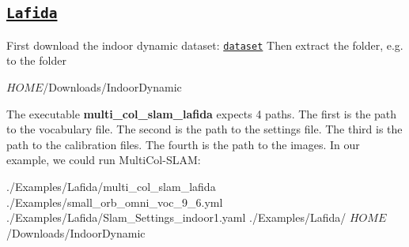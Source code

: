 \subsection*{\href{http://www.ipf.kit.edu/lafida.php}{\tt Lafida}}

First download the indoor dynamic dataset\+: \href{http://www2.ipf.kit.edu/~pcv2016/downloads/indoor_dynamic.zip}{\tt dataset} Then extract the folder, e.\+g. to the folder \begin{DoxyVerb}$HOME$/Downloads/IndoorDynamic
\end{DoxyVerb}


The executable {\bfseries multi\+\_\+col\+\_\+slam\+\_\+lafida} expects 4 paths. The first is the path to the vocabulary file. The second is the path to the settings file. The third is the path to the calibration files. The fourth is the path to the images. In our example, we could run Multi\+Col-\/\+S\+L\+AM\+: \begin{DoxyVerb}./Examples/Lafida/multi_col_slam_lafida ./Examples/small_orb_omni_voc_9_6.yml  ./Examples/Lafida/Slam_Settings_indoor1.yaml ./Examples/Lafida/ $HOME$/Downloads/IndoorDynamic\end{DoxyVerb}
 